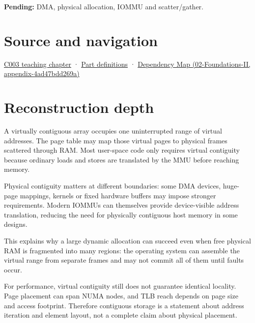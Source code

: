 \textbf{Pending:} DMA, physical allocation, IOMMU and scatter/gather.

\section{Source and navigation}\label{appendix-f897c1ddac8f-source-and-navigation}

\href{Continuous\%20Notes/Computing\%20Foundations\%20-\%20From\%20Bits\%20to\%20C++\%20and\%20Systems\%20APIs\#Where\%20the\%20bytes\%20live}{C003 teaching chapter} · \hyperref[appendix-fd090d982a15-m003---parts-41-60]{Part definitions} · \href{../02-Foundations-II/main.pdf\#nameddest=appendix-4ad47bdd269a}{Dependency Map (02-Foundations-II, appendix-4ad47bdd269a)}

\section{Reconstruction depth}\label{appendix-f897c1ddac8f-reconstruction-depth}

A virtually contiguous array occupies one uninterrupted range of virtual addresses. The page table may map those virtual pages to physical frames scattered through RAM. Most user-space code only requires virtual contiguity because ordinary loads and stores are translated by the MMU before reaching memory.

Physical contiguity matters at different boundaries: some DMA devices, huge-page mappings, kernels or fixed hardware buffers may impose stronger requirements. Modern IOMMUs can themselves provide device-visible address translation, reducing the need for physically contiguous host memory in some designs.

This explains why a large dynamic allocation can succeed even when free physical RAM is fragmented into many regions: the operating system can assemble the virtual range from separate frames and may not commit all of them until faults occur.

For performance, virtual contiguity still does not guarantee identical locality. Page placement can span NUMA nodes, and TLB reach depends on page size and access footprint. Therefore contiguous storage is a statement about address iteration and element layout, not a complete claim about physical placement.
